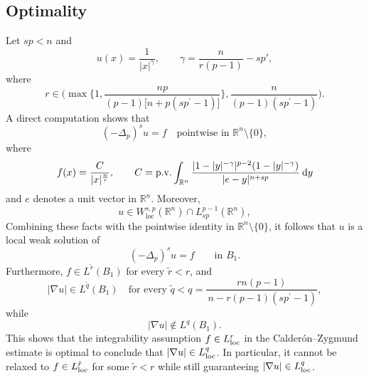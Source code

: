 \documentclass[10pt,letterpaper]{amsart}
\theoremstyle{definition}
\numberwithin{theorem}{section}
\numberwithin{equation}{section}
\newcommand{\R}{\ensuremath{\mathbb{R}}}
\newcommand{\1}{\ensuremath{\mathds{1}}}
\renewcommand{\d}{\:\! \mathrm{d}}
\DeclareMathOperator{\loc}{loc}
\numberwithin{equation}{section}
\begin{document}
\subsection{Optimality}\label{sec:optimal}
Let $sp<n$ and 
\[
u(x)=\frac{1}{|x|^{\gamma}},
\qquad\gamma=\frac{n}{r(p-1)}-sp',
\]
where
\begin{equation*}
r\in\bigg(\max\bigg\{1,\frac{np}{(p-1)\big[n+p(sp^{\prime}-1)\big]}\bigg\},
\frac{n}{(p-1)(sp^{\prime}-1)}\bigg).
\end{equation*}
A direct computation shows that
\[
(-\Delta_p)^su=f
\quad \text{pointwise in } \mathbb{R}^n\setminus\{0\},
\]
where
\[
f(x)=\frac{C}{|x|^{\frac{n}{r}}},
\qquad
C={\rm p.v.}\int_{\mathbb{R}^n}
\frac{|1-|y|^{-\gamma}|^{p-2}(1-|y|^{-\gamma})}{|e-y|^{n+sp}}
\, \d y
\]
and $e$ denotes a unit vector in $\R^n$. 
Moreover,
\[
u\in W^{s,p}_{\loc}(\mathbb{R}^n)\cap L^{p-1}_{sp}(\mathbb{R}^n),
\]
Combining these facts with the pointwise identity in 
\(\mathbb{R}^n\setminus\{0\}\), it follows that \(u\) is a local weak solution of
\[
(-\Delta_p)^s u=f
\qquad \text{in } B_1 .
\]
Furthermore, \(f\in L^{\tilde r}(B_1)\) for every \(\tilde r<r\), and
\[
|\nabla u|\in L^{\tilde q}(B_1)
\quad \text{for every } \tilde q<q=\frac{rn(p-1)}{\,n-r(p-1)(sp^{\prime}-1)},
\]
while
\[
|\nabla u|\notin L^{q}(B_1).
\]
This shows that the integrability assumption \(f\in L^{r}_{\rm loc}\) in the
Calderón--Zygmund estimate is optimal to conclude that
\(|\nabla u|\in L^{q}_{\rm loc}\). In particular, it cannot be relaxed to
\(f\in L^{\tilde r}_{\rm loc}\) for some \(\tilde r<r\) while still guaranteeing
\(|\nabla u|\in L^{q}_{\rm loc}\).
\end{document}
